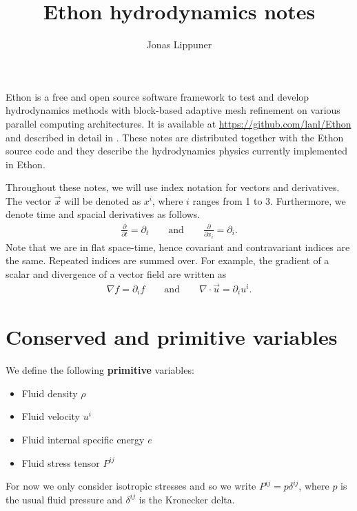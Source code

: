 \documentclass{article}
\begin{document}
\author{Jonas Lippuner}
\title{Ethon hydrodynamics notes}

\maketitle

Ethon is a free and open source software framework to test and develop hydrodynamics methods
with block-based  adaptive mesh refinement on various parallel computing architectures. It
is available at \url{https://github.com/lanl/Ethon} and described in detail in \cite{lippuner:21}.
These notes are distributed together with the Ethon source code and they describe
the hydrodynamics physics currently implemented in Ethon.

Throughout these notes, we will use index notation for vectors and derivatives. The vector $\vec x$
will be denoted as $x^i$, where $i$ ranges from 1 to 3. Furthermore, we denote time and spacial
derivatives as follows.
\begin{align}
  \frac{\partial}{\partial t} = \partial_t
  \qquad \text{and} \qquad
  \frac{\partial}{\partial x_i} = \partial_i.
\end{align}
Note that we are in flat space-time, hence covariant and contravariant indices are the same.
Repeated indices are summed over. For example, the gradient of a scalar and divergence of a vector
field are written as
\begin{align}
  \label{eq:examples}
  \nabla f = \partial_i f
  \qquad \text{and} \qquad
  \nabla \cdot \vec u = \partial_i u^i.
\end{align}

\section{Conserved and primitive variables}

We define the following \textbf{primitive} variables:
\begin{itemize}
  \item Fluid density $\rho$
  \item Fluid velocity $u^i$
  \item Fluid internal specific energy $e$
  \item Fluid stress tensor $P^{ij}$
\end{itemize}
For now we only consider isotropic stresses and so we write $P^{ij} = p\delta^{ij}$, where $p$ is
the usual fluid pressure and $\delta^{ij}$ is the Kronecker delta.
\end{document}
